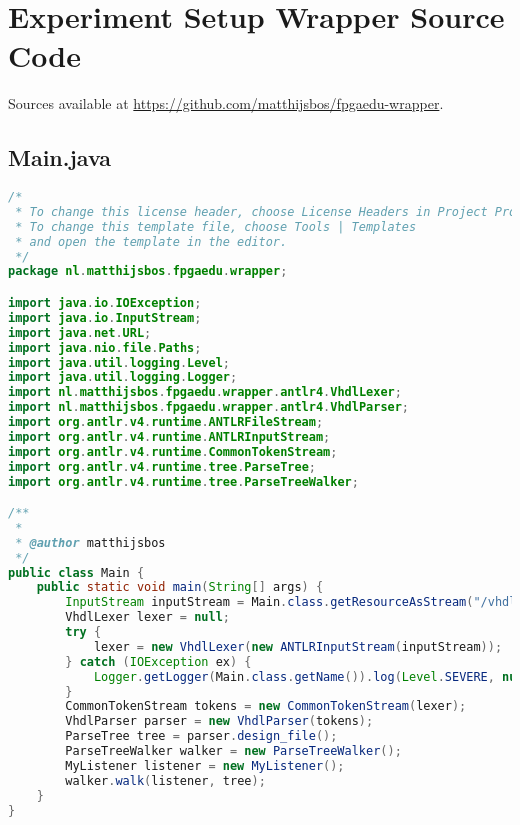 \documentclass[main.tex]{subfiles}
\begin{document}
\chapter{Experiment Setup Wrapper Source Code}
\label{chapter:fpga-edu-wrapper-sources}
Sources available at \url{https://github.com/matthijsbos/fpgaedu-wrapper}.

\captionsetup{margin=0in,format=hang}
\lstset{captionpos=t, xleftmargin=0in, xrightmargin=0in,  basicstyle=\small}

\section{Main.java}
\begin{lstlisting}[language=Java, caption={Contents of \texttt{./src/main/java/nl/matthijsbos/fpgaedu/wrapper/Main.java}}]
/*
 * To change this license header, choose License Headers in Project Properties.
 * To change this template file, choose Tools | Templates
 * and open the template in the editor.
 */
package nl.matthijsbos.fpgaedu.wrapper;

import java.io.IOException;
import java.io.InputStream;
import java.net.URL;
import java.nio.file.Paths;
import java.util.logging.Level;
import java.util.logging.Logger;
import nl.matthijsbos.fpgaedu.wrapper.antlr4.VhdlLexer;
import nl.matthijsbos.fpgaedu.wrapper.antlr4.VhdlParser;
import org.antlr.v4.runtime.ANTLRFileStream;
import org.antlr.v4.runtime.ANTLRInputStream;
import org.antlr.v4.runtime.CommonTokenStream;
import org.antlr.v4.runtime.tree.ParseTree;
import org.antlr.v4.runtime.tree.ParseTreeWalker;

/**
 *
 * @author matthijsbos
 */
public class Main {
    public static void main(String[] args) {        
        InputStream inputStream = Main.class.getResourceAsStream("/vhdl/nexys4testsetup.vhd");
        VhdlLexer lexer = null;
        try {
            lexer = new VhdlLexer(new ANTLRInputStream(inputStream));
        } catch (IOException ex) {
            Logger.getLogger(Main.class.getName()).log(Level.SEVERE, null, ex);
        }
        CommonTokenStream tokens = new CommonTokenStream(lexer);
        VhdlParser parser = new VhdlParser(tokens);
        ParseTree tree = parser.design_file();
        ParseTreeWalker walker = new ParseTreeWalker();
        MyListener listener = new MyListener();
        walker.walk(listener, tree);
    }
}

\end{lstlisting}
\end{document}
